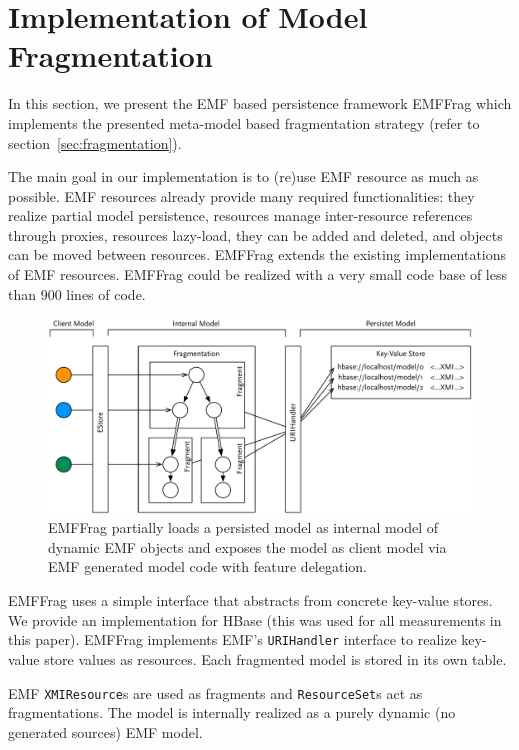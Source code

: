 \section{Implementation of Model Fragmentation}
\label{sec:implemention}

In this section, we present the EMF based persistence framework EMFFrag which implements the presented meta-model based fragmentation strategy (refer to section~\ref{sec:fragmentation}).

The main goal in our implementation is to (re)use EMF resource as much as possible. EMF resources already provide many required functionalities: they realize partial model persistence, resources manage inter-resource references through proxies, resources lazy-load, they can be added and deleted, and objects can be moved between resources. EMFFrag extends the existing implementations of EMF resources. EMFFrag could be realized with a very small code base of less than 900 lines of code.

\begin{figure}[t]
  \centering
  \includegraphics[width=0.8\linewidth]{figures/simpleArchitecture}
  \caption{EMFFrag partially loads a persisted model as internal model of dynamic EMF objects and exposes the model as client model via EMF generated model code with feature delegation.}
  \label{fig:architecture}
\end{figure}

EMFFrag uses a simple interface that abstracts from concrete key-value stores. We provide an implementation for HBase (this was used for all measurements in this paper). EMFFrag implements EMF's \texttt{URIHandler} interface to realize key-value store values as resources. Each fragmented model is stored in its own table.

 EMF \texttt{XMIResource}s are used as fragments and \texttt{ResourceSet}s act as fragmentations. The model is internally realized as a purely dynamic (no generated sources) EMF model.

